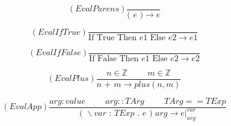 \documentclass{article}
\begin{document}
\begin{figure}
\center

\[(EvalParens)\frac{}{\text{( } e \text{ )} \rightarrow e}\]

\[(EvalIfTrue) \frac{}{\text{If } \text{True } \text{Then } e1 \text{ Else } e2 \rightarrow e1}\]

\[(EvalIfFalse)\frac{}{\text{If } \text{False } \text{Then } e1 \text{ Else } e2 \rightarrow e2}\]


\[(EvalPlus)\frac{n \in \mathbb{Z} \hspace{1cm} m \in \mathbb{Z}}{n \text{ + } m \rightarrow plus(n, m)}\]


\[(EvalApp)\frac{arg:value \hspace{1cm} arg :: TArg \hspace{1cm} TArg == TExp}{\text{( } \backslash var \text{ : } TExp \text{ . } e \text{ ) } arg \rightarrow e\vert^{var}_{arg} }\]


\end{figure}
\end{document}
